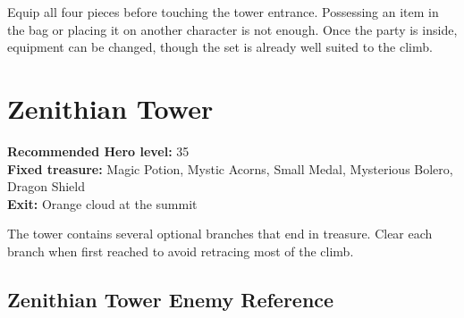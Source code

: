 \documentclass[
  american,
  10pt,
  letterpaper,
  oneside,
  open=any]{scrreprt}
\begin{document}
Equip all four pieces before touching the tower entrance. Possessing an
item in the bag or placing it on another character is not enough. Once
the party is inside, equipment can be changed, though the set is already
well suited to the climb.

\section{Zenithian Tower}\label{zenithian-tower}

\textbf{Recommended Hero level:} 35\\
\textbf{Fixed treasure:} Magic Potion, Mystic Acorns, Small Medal,
Mysterious Bolero, Dragon Shield\\
\textbf{Exit:} Orange cloud at the summit

The tower contains several optional branches that end in treasure. Clear
each branch when first reached to avoid retracing most of the climb.

\subsection{Zenithian Tower Enemy
Reference}\label{zenithian-tower-enemy-reference}
\end{document}
